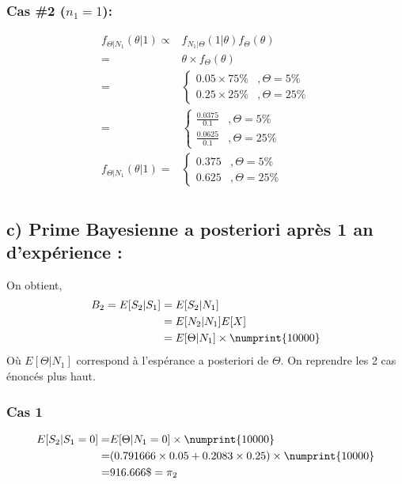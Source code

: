 \documentclass[11pt,french]{report}
\begin{document}
\subsubsection*{Cas \#2 ($n_1 = 1$): }
\begin{align*}
f_{\Theta|N_1}(\theta|1) \propto & f_{N_1|\Theta}(1|\theta) f_{\Theta}(\theta) \\
= & \theta \times  f_{\Theta}(\theta) \\
= & \left\{
     \begin{array}{rl}
      0.05 \times  75\% &, \Theta = 5\% \\
      0.25 \times  25\% &, \Theta = 25\%
     \end{array}
     \right. \\
= & \left\{
     \begin{array}{rl}
      \frac{0.0375}{0.1} &, \Theta = 5\% \\
      \frac{0.0625}{0.1} &, \Theta = 25\%
     \end{array}
     \right. \\
f_{\Theta|N_1}(\theta|1) = & \left\{
     \begin{array}{rl}
      0.375 &, \Theta = 5\% \\
      0.625 &, \Theta = 25\%
     \end{array}
     \right. \\
\end{align*}

\subsection*{c) Prime Bayesienne a posteriori après 1 an d'expérience :}
On obtient,
\begin{align*}
B_2 = E[S_2|S_1] &= E[S_2|N_1] \\
&= E[N_2|N_1] E[X] \\
&= E[\Theta|N_1] \times  \numprint{10000}
\end{align*}
Où $E[\Theta|N_1]$ correspond à l'espérance a posteriori de $\Theta$.
On reprendre les 2 cas énoncés plus haut.

\subsubsection*{Cas 1}
\begin{align*}
E[S_2|S_1 = 0] =& E[\Theta|N_1 = 0] \times  \numprint{10000} \\
=& (0.791666\times 0.05 + 0.2083\times 0.25) \times  \numprint{10000}\\
=& 916.666\$ = \pi_2
\end{align*}
\end{document}
